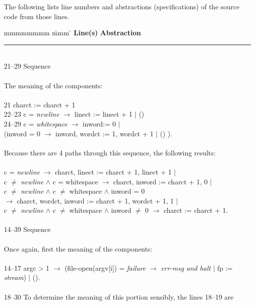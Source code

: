 %
%

The following lists line numbers and abstractions (specifications) of
the source code from those lines.

\begin{tabbing}
mmmmmmmm   \= mmm \= \kill
{\bf Line(s)} \> {\bf Abstraction}							\\
\rule{\textwidth}{.5pt}\\ 
21--29	\> Sequence									\\
											\\
	\>The meaning of the components:						\\
											\\
21	\> charct := charct + 1								\\
22--23  \> c = {\em newline} $\rightarrow$ linect := linect + 1 $\mid$ ()  		\\
24--29	\> c = {\em whitespace} $\rightarrow$ inword:= 0 $\mid$ 				\\
	\> \>	(inword = 0 $\rightarrow$ inword, wordct := 1, wordct + 1 $\mid$ () ).	\\
											\\
	\> Because there are 4 paths through this sequence, the following results:	\\
											\\
	\> c = {\em newline} $\rightarrow$ charct, linect := charct + 1, linect + 1 $\mid$	\\
	\> c $\not=$ {\em newline} $\wedge$ c = whitespace $\rightarrow$ charct, inword := charct + 1, 0 $\mid$\\
	\> c $\not=$ {\em newline} $\wedge$ c $\not=$ whitespace $\wedge$ inword = 0 		\\
	\> \>	$\rightarrow$ charct, wordct, inword := charct + 1, wordct + 1, 1 $\mid$\\
	\> c $\not=$ {\em newline} $\wedge$ c $\not=$ whitespace $\wedge$ inword $\not=$ 0 $\rightarrow$ charct := charct + 1.\\
\\
14--39	\> Sequence\\
\\
	Once again, first the meaning of the components:\\
\\
14--17	\>argc > 1 $\rightarrow$ (file-open(argv[i]) = {\em failure} $\rightarrow$ {\em err-msg and halt} $\mid$ fp := {\em stream}) $\mid$ ().\\
\\
18--30	\> To determine the meaning of this portion sensibly, the lines 18--19 are \\

\end{tabbing}
